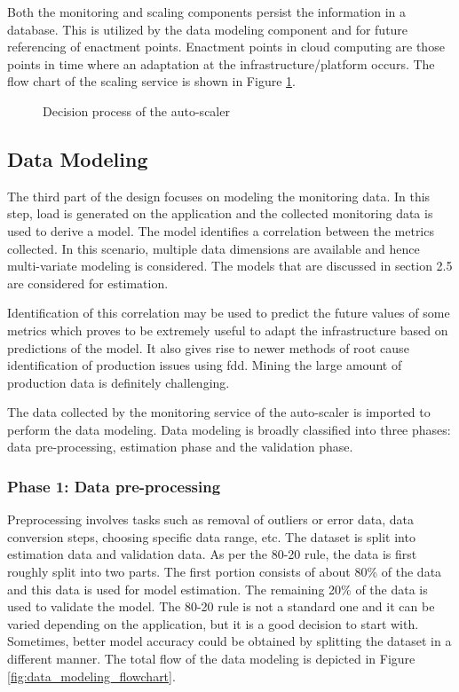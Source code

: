 \documentclass[article,type=msc,colorback,12pt,accentcolor=tud8b,table]{tudthesis}
\begin{document}
	 Both the monitoring and scaling components persist the information in a database. This is utilized by the data modeling component and for future referencing of enactment points. Enactment points in cloud computing are those points in time where an adaptation at the infrastructure/platform occurs. The flow chart of the scaling service is shown in Figure \ref{fig:autoscaler}.
	 
	  	 	 \begin{figure}[!h]
	  	 	 	\begin{center}
	  	 	 	\end{center}
	  	 	 	\caption{Decision process of the auto-scaler}
	  	 	 	\label{fig:autoscaler}
	  	 	 \end{figure}

 	\subsection{Data Modeling}
 	
 	The third part of the design focuses on modeling the monitoring data. In this step, load is generated on the application and the collected monitoring data is used to derive a model. The model identifies a correlation between the metrics collected. In this scenario, multiple data dimensions are available and hence multi-variate modeling is considered. The models that are discussed in section 2.5 are considered for estimation. 
 	
	 Identification of this correlation may be used to predict the future values of some metrics which proves to be extremely useful to adapt the infrastructure based on predictions of the model. It also gives rise to newer methods of root cause identification of production issues using \gls{fdd}. Mining the large amount of production data is definitely challenging.
 	
 	The data collected by the monitoring service of the auto-scaler is imported to perform the data modeling. Data modeling is broadly classified into three phases: data pre-processing, estimation phase and the validation phase. 
 	
 	 \subsubsection{Phase 1: Data pre-processing}
 	
 	Preprocessing involves tasks such as removal of outliers or error data, data conversion steps, choosing specific data range, etc. The dataset is split into estimation data and validation data. As per the 80-20 rule, the data is first roughly split into two parts. The first portion consists of about 80\% of the data and this data is used for model estimation. The remaining 20\% of the data is used to validate the model. The 80-20 rule is not a standard one and it can be varied depending on the application, but it is a good decision to start with. Sometimes, better model accuracy could be obtained by splitting the dataset in a different manner. The total flow of the data modeling is depicted in Figure \ref{fig:data_modeling_flowchart}.
 	
\end{document}
